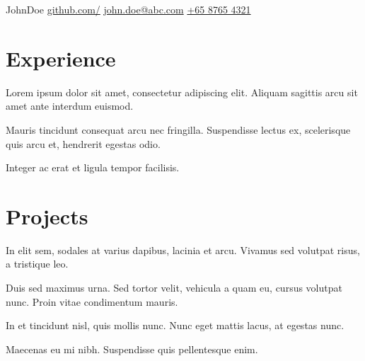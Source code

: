 \documentclass[]{resume}
\begin{document}
%
%

\namesection
{John}{Doe}
{
    \contactline
    {\href{https://www.github.com/}{github.com/}}
    {\href{mailto:john.doe@abc.com}{john.doe@abc.com}}
    {\href{tel:+6587654321}{+65 8765 4321}}
}



\section{Experience}

\hspace*{\fill}
\begin{tightemize}
    \item Lorem ipsum dolor sit amet, consectetur adipiscing elit. Aliquam sagittis arcu sit amet ante interdum euismod.
    \item Mauris tincidunt consequat arcu nec fringilla. Suspendisse lectus ex, scelerisque quis arcu et, hendrerit egestas odio.
    \item Integer ac erat et ligula tempor facilisis.
\end{tightemize}
\sectionsep



\section{Projects}

\hspace*{\fill}
\begin{tightemize}
    \item In elit sem, sodales at varius dapibus, lacinia et arcu. Vivamus sed volutpat risus, a tristique leo. 
    \item Duis sed maximus urna. Sed tortor velit, vehicula a quam eu, cursus volutpat nunc. Proin vitae condimentum mauris. 
\end{tightemize}
\sectionsep

\hspace*{\fill}
\begin{tightemize}
    \item In et tincidunt nisl, quis mollis nunc. Nunc eget mattis lacus, at egestas nunc.
    \item Maecenas eu mi nibh. Suspendisse quis pellentesque enim.
\end{tightemize}
\sectionsep
\end{document}
